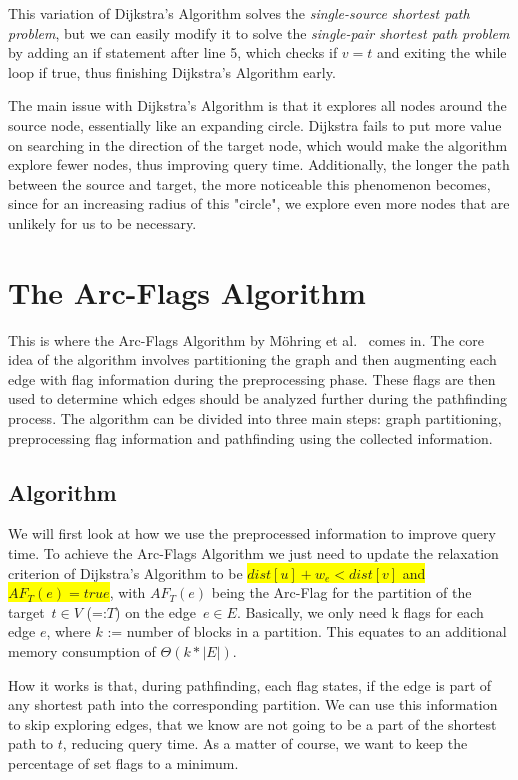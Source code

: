 \documentclass[acmsmall,nonacm,screen,review]{acmart}
\begin{document}
This variation of Dijkstra's Algorithm solves the \textit{single-source shortest path problem}, but we can easily modify it to solve the
\textit{single-pair shortest path problem} by adding an if statement after line 5, which checks if $v = t$ and exiting the while loop if true,
thus finishing Dijkstra's Algorithm early.

The main issue with Dijkstra's Algorithm is that it explores all nodes around the source node, essentially like an expanding circle. Dijkstra fails to put
more value on searching in the direction of the target node, which would make the algorithm explore fewer nodes, thus improving query time. Additionally, the
longer the path between the source and target, the more noticeable this phenomenon becomes, since for an increasing radius of this "circle", we explore
even more nodes that are unlikely for us to be necessary. 

\section{The Arc-Flags Algorithm}
\label{4}
This is where the Arc-Flags Algorithm by Möhring et al.~\cite{DBLP:journals/jea/MohringSSWW06} comes in.
The core idea of the algorithm involves partitioning the graph and then augmenting each edge with flag information during the preprocessing phase.
These flags are then used
to determine which edges should be analyzed further during the pathfinding process. The algorithm can be divided into three main steps: graph partitioning,
preprocessing flag information and pathfinding using the collected information.

\subsection{Algorithm}
\label{4.1}
We will first look at how we use the preprocessed information to improve query time.
To achieve the Arc-Flags Algorithm we just need to update the relaxation criterion of Dijkstra's Algorithm to be
\colorbox{yellow}{$dist[u] + w_e < dist[v]$ and $AF_{T}(e) = true$}, with $AF_{T}(e)$ being the Arc-Flag for the partition of the target~$t \in V$ (=:$T$) on the edge~$e \in E$.
Basically, we only need k flags for each edge $e$, where $k$ := number of blocks in a partition. This equates to an additional memory
consumption of $\Theta(k*|E|)$.

How it works is that, during pathfinding, each flag states, if the edge is part of any shortest path into the corresponding partition.
We can use this information to skip exploring edges, that we know are not going to be a part of the shortest path to $t$, reducing query time. As a matter of
course, we want to keep the percentage of set flags to a minimum.
\end{document}
